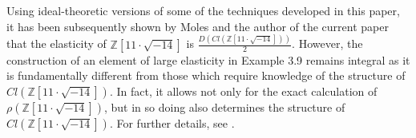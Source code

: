 \documentclass{amsart}
\theoremstyle{definition}
\newcommand{\bbz}{\mathbb{Z}}
\numberwithin{equation}{section}
\begin{document}
Using ideal-theoretic versions of some of the techniques developed in this paper, it has been subsequently shown by Moles and the author of the current paper that the elasticity of $\bbz[11\cdot\sqrt{-14}]$ is $\frac{D(Cl(\bbz[11\cdot \sqrt{-14}]))}{2}$. However, the construction of an element of large elasticity in Example 3.9 remains integral as it is fundamentally different from those which require knowledge of the structure of $Cl(\bbz[11\cdot\sqrt{-14}])$. In fact, it allows not only for the exact calculation of $\rho(\bbz[11\cdot\sqrt{-14}])$, but in so doing also determines the structure of $Cl(\bbz[11\cdot\sqrt{-14}])$. For further details, see \cite{kettinger2025elasticity}.
 


{}

\end{document}
